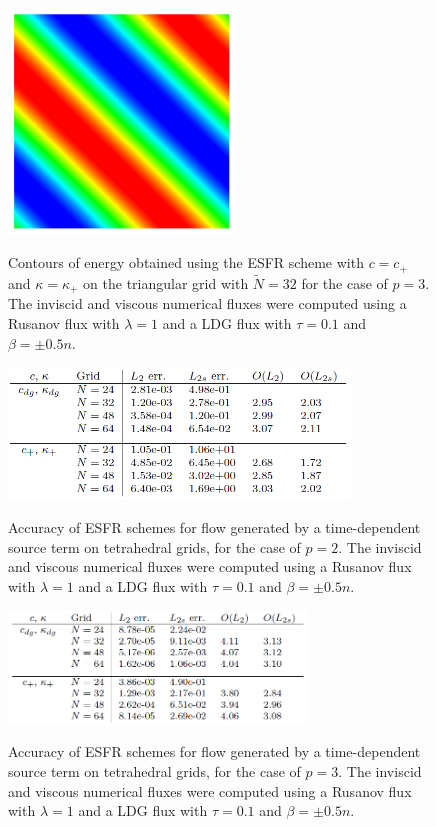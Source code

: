 \begin{figure}
\centering
\includegraphics[height=60mm]{figure_912} \\
\caption{Contours of energy obtained using the ESFR scheme with $c = c_+$ and $\kappa = \kappa_+$ on the triangular grid with $\tilde{N} = 32$ for the case of $p = 3$. The inviscid and viscous numerical fluxes were computed using a Rusanov flux with $\lambda = 1$ and a LDG flux with $\tau = 0.1$ and $\beta = \pm 0.5n$.}
\label{fig:figure_912}
\end{figure}

\begin{figure}
\centering
\includegraphics[height=35mm]{table_920} \\
\caption{Accuracy of ESFR schemes for flow generated by a time-dependent source term on tetrahedral grids, for the case of $p = 2$. The inviscid and viscous numerical fluxes were computed using a Rusanov flux with $\lambda = 1$ and a LDG flux with $\tau = 0.1$ and $\beta = \pm 0.5n$.}
\label{fig:table_920}
\end{figure}

\begin{figure}
\centering
\includegraphics[height=30mm]{table_921} \\
\caption{Accuracy of ESFR schemes for flow generated by a time-dependent source term on tetrahedral grids, for the case of $p = 3$. The inviscid and viscous numerical fluxes were computed using a Rusanov flux with $\lambda = 1$ and a LDG flux with $\tau = 0.1$ and $\beta = \pm 0.5n$.}
\label{fig:table_921}
\end{figure}

